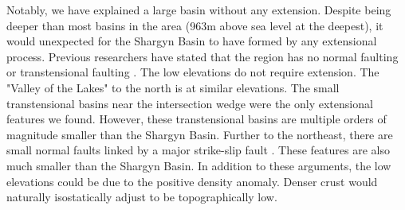 	Notably, we have explained a large basin without any extension. Despite being deeper than most basins in the area (963m above sea level at the deepest), it would unexpected for the Shargyn Basin to have formed by any extensional process. Previous researchers have stated that the region has no normal faulting or transtensional faulting \citep{Cunningham2005a}. The low elevations do not require extension. The "Valley of the Lakes" to the north is at similar elevations. The small transtensional basins near the intersection wedge were the only extensional features we found. However, these transtensional basins are multiple orders of magnitude smaller than the Shargyn Basin. Further to the northeast, there are small normal faults linked by a major strike-slip fault \citep{Walker2006}. These features are also much smaller than the Shargyn Basin. In addition to these arguments, the low elevations could be due to the positive density anomaly. Denser crust would naturally isostatically adjust to be topographically low. 



